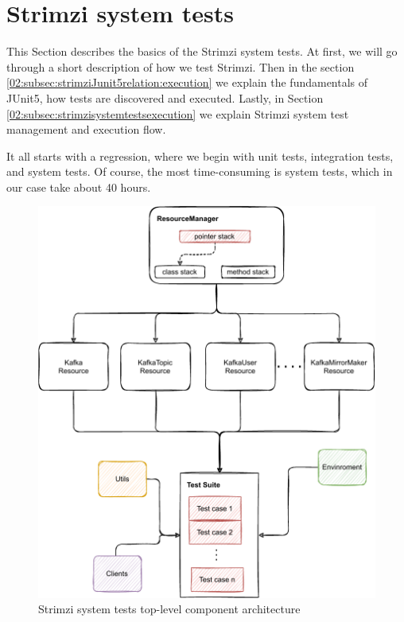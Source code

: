 \section{Strimzi system tests}
\label{02:sec:strimzisystemtests}

This Section describes the basics of the Strimzi system tests.
At first, we will go through a short description of how we test Strimzi.
Then in the section \ref{02:subsec:strimziJunit5relation:execution} we explain the fundamentals of JUnit5, how tests are discovered and executed. Lastly, in Section \ref{02:subsec:strimzisystemtestsexecution} we explain Strimzi system test management and execution flow. 

It all starts with a regression, where we begin with unit tests, integration tests, and system tests. Of course, the most time-consuming is system tests, which in our case take about 40 hours. 
\begin{figure}[!ht]
    \centering
    \includegraphics[scale=0.80]{obrazky-figures/02-preliminaries/04-strimzi-system-tests/01-architecture-overall.pdf}
    \caption{Strimzi system tests top-level component architecture}
    \label{02d:fig:strimzisystemtestarch}
\end{figure}
